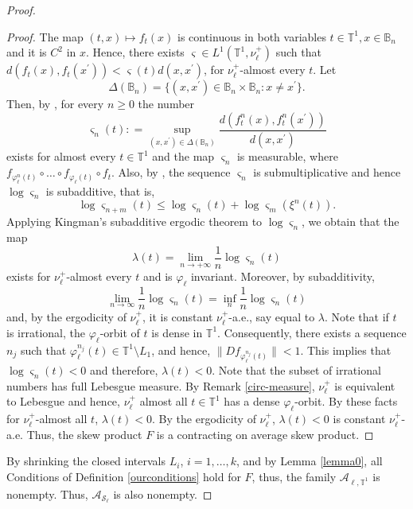 \documentclass[11pt,reqno]{amsart}
\theoremstyle{plain}
\newtheorem*{theorem A}{Theorem A}
\newtheorem*{theorem B}{Theorem B}
\newtheorem*{theorem C}{Theorem C}
\newtheorem*{theorem 1}{Theorem 1}
\newtheorem*{theorem 2}{Theorem 2}
\newtheorem*{theorem 3}{Theorem 3}
\numberwithin{equation}{section}
\begin{document}
\begin{proof}
\begin{proof}
The map $(t,x)\mapsto f_t(x)$ is continuous in both variables $t\in \mathbb{T}^1, x \in \mathbb{B}_n$ and it is $C^2$ in $x$.
Hence, there exists $\varsigma \in L^1(\mathbb{T}^1,\nu_\ell^+)$ such that $d(f_t(x),f_t(x^{\prime}))<\varsigma(t)d(x,x^{\prime})$, for $\nu_\ell^+$-almost every $t$.
Let
$$ \Delta(\mathbb{B}_n)=\{(x,x^{\prime}) \in \mathbb{B}_n \times \mathbb{B}_n \colon x\neq x^{\prime}\}.$$
Then, by \cite[Lem.~5.1]{stark1999regularity}, for every $n\geq 0$ the number
\begin{equation*}
\varsigma_n(t) : =\sup_{(x,x^{\prime})\in \Delta(\mathbb{B}_n)}\frac{d(f_t^n(x) , f_t^n(x^{\prime}))}{d(x,x^{\prime})}
\end{equation*}
exists for almost every $t\in \mathbb{T}^1$ and the map $\varsigma_n$ is measurable, where $f_{\varphi_\ell^n(t)}\circ \dots \circ f_{\varphi_\ell(t)} \circ f_{t}$.
Also, by \cite[Lem.~5.3]{stark1999regularity}, the sequence $\varsigma_n$ is submultiplicative and hence $\log \varsigma_n$ is subadditive, that is,
$$
\log \varsigma_{n+m}(t)\leq \log \varsigma_n(t)+ \log \varsigma_m(\xi^n(t)).
$$
Applying Kingman's subadditive ergodic theorem \cite[Thm.~5.4]{krengel2011ergodic} to $\log \varsigma_n$, we obtain that the map
\begin{equation*}
\lambda(t)=\lim_{n \to +\infty}\frac{1}{n}\log \varsigma_n(t)
\end{equation*}
exists for $\nu_\ell^+$-almost every $t$ and is $\varphi_\ell$ invariant. Moreover, by subadditivity,
\begin{equation*}
\lim_{n \to \infty}\frac{1}{n}\log \varsigma_n(t)= \inf_{n}\frac{1}{n}\log \varsigma_n(t)
\end{equation*}
and, by the ergodicity of $\nu_\ell^+$, it is constant $\nu_\ell^+$-a.e., say equal to $\lambda$.
Note that if $t$ is irrational, the $\varphi_\ell$-orbit of $t$ is dense in $\mathbb{T}^1$.
Consequently, there exists a sequence $n_j$ such that $\varphi_\ell^{n_j}(t) \in \mathbb{T}^1 \setminus L_1$, and hence, $\|Df_{\varphi_\ell^{n_j}(t)}\| < 1$. This implies that $\log \varsigma_n(t)<0$ and therefore, $\lambda(t)<0$.
Note that the subset of irrational numbers has full Lebesgue measure. By Remark \ref{circ-measure}, $\nu^+_\ell$ is equivalent to Lebesgue and hence, $\nu^+_\ell$ almost all $t\in \mathbb{T}^1$ has a dense $\varphi_\ell$-orbit.
By these facts for $\nu_\ell^+$-almost all $t$, $\lambda(t)<0$.
By the ergodicity of $\nu_\ell^+$, $\lambda(t)<0$ is constant $\nu_\ell^+$-a.e.
Thus, the skew product $F$ is a contracting on average skew product.
\end{proof}

By shrinking the closed intervals $L_i$, $i=1, \dots, k$, and by Lemma \ref{lemma0}, all Conditions of Definition \ref{ourconditions} hold for $F$, thus, the family $\mathcal{A}_{\ell, \mathbb{T}^1} $ is nonempty.
Thus, $\mathcal{A}_{\mathcal{S}_\ell} $ is also nonempty.
\end{proof}














\end{document}
